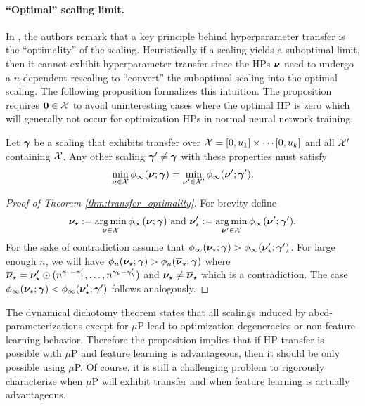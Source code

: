 \paragraph{``Optimal'' scaling limit.} 
In \citep{yang2022tensor, yang2023depth}, the authors remark that a key principle behind hyperparameter transfer is the ``optimality'' of the scaling. Heuristically if a scaling yields a suboptimal limit, then it cannot exhibit hyperparameter transfer since the HPs $\bm{\nu}$ need to undergo a $n$-dependent rescaling to ``convert'' the suboptimal scaling into the optimal scaling. The following proposition formalizes this intuition. The proposition requires ${\boldsymbol 0} \in \mathcal{X}$ to avoid uninteresting cases where the optimal HP is zero which will generally not occur for optimization HPs in normal neural network training.
\begin{theorem}\label{thm:transfer_optimality}
    Let $\bm{\gamma}$ be a scaling that exhibits transfer over $\mathcal{X} = [0, u_1] \times \cdots [0, u_k]$ and all $\mathcal{X}'$ containing $\mathcal{X}$. Any other scaling $\bm{\gamma}' \neq \bm{\gamma}$ with these properties must satisfy 
    \[
    \min_{\bm{\nu} \in \mathcal{X}} \phi_\infty(\bm{\nu}; \bm{\gamma}) = \min_{\bm{\nu}' \in \mathcal{X}'} \phi_\infty(\bm{\nu}'; \bm{\gamma}').
    \]
\end{theorem}
\begin{proof}[Proof of Theorem \ref{thm:transfer_optimality}]
    For brevity define
    \[
        \bm{\nu}_\star := \operatorname*{arg\,min}_{\bm{\nu} \in \mathcal{X}} \phi_\infty(\bm{\nu}; \bm{\gamma}) \text{ and } \bm{\nu}'_\star := \operatorname*{arg\,min}_{\bm{\nu}' \in \mathcal{X}} \phi_\infty(\bm{\nu}'; \bm{\gamma}').
    \]
    For the sake of contradiction assume that $\phi_\infty(\bm{\nu}_\star; \bm{\gamma}) > \phi_\infty(\bm{\nu}_\star'; \bm{\gamma}')$. For large enough $n$, we will have $\phi_n(\bm{\nu}_\star; \bm{\gamma}) > \phi_n(\overline{\bm{\nu}}_\star; \bm{\gamma})$ where $\overline{\bm{\nu}}_\star = \bm{\nu}'_\star \odot (n^{\gamma_1 - \gamma'_1}, \ldots, n^{\gamma_k - \gamma'_k})$ and $\bm{\nu}_\star \neq \overline{\bm{\nu}}_\star$ which is a contradiction. The case $\phi_\infty(\bm{\nu}_\star; \bm{\gamma}) < \phi_\infty(\bm{\nu}_\star'; \bm{\gamma}')$ follows analogously.
\end{proof}

The dynamical dichotomy theorem states that all scalings induced by abcd-parameterizations except for $\mu$P lead to optimization degeneracies or non-feature learning behavior. Therefore the proposition implies that if HP transfer is possible with $\mu$P and feature learning is advantageous, then it should be only possible using $\mu$P. Of course, it is still a challenging problem to rigorously characterize when $\mu$P will exhibit transfer and when feature learning is actually advantageous.

